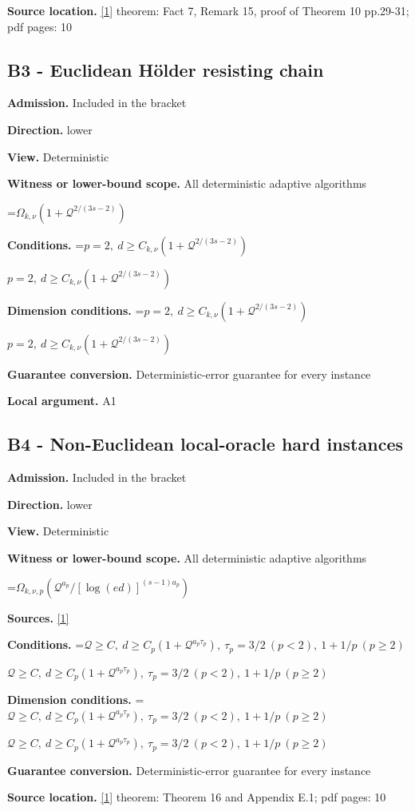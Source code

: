\documentclass[10pt,a4paper]{article}
\newcommand{\AtlasMath}[1]{\par\begingroup\centering\setbox0=\hbox{$\displaystyle #1$}\ifdim\wd0>1.4\linewidth\typeout{ATLAS WIDE FORMULA: \the\wd0}\fi\ifdim\wd0>\linewidth\resizebox{\linewidth}{!}{\box0}\else\box0\fi\par\endgroup}
\newcommand{\AtlasInlineMath}[1]{\begingroup\setbox0=\hbox{$#1$}\ifdim\wd0>.4\linewidth\endgroup\AtlasMath{#1}\else\endgroup$#1$\fi}
\begin{document}
\textbf{Source location.} \href{https://arxiv.org/pdf/2411.08987v2}{[1]} theorem: Fact 7, Remark 15, proof of Theorem 10 pp.29-31; pdf pages: 10

\subsection{B3 - Euclidean Hölder resisting chain}
\textbf{Admission.} Included in the bracket

\textbf{Direction.} lower

\textbf{View.} Deterministic

\textbf{Witness or lower-bound scope.} All deterministic adaptive algorithms

\AtlasMath{\Omega_{k,\nu}(1+\mathcal{Q}^{2/(3s-2)})}
\textbf{Conditions.} \AtlasInlineMath{p=2,\ d\ge C_{k,\nu}(1+\mathcal{Q}^{2/(3s-2)})}

\textbf{Dimension conditions.} \AtlasInlineMath{p=2,\ d\ge C_{k,\nu}(1+\mathcal{Q}^{2/(3s-2)})}

\textbf{Guarantee conversion.} Deterministic-error guarantee for every instance

\textbf{Local argument.} A1

\subsection{B4 - Non-Euclidean local-oracle hard instances}
\textbf{Admission.} Included in the bracket

\textbf{Direction.} lower

\textbf{View.} Deterministic

\textbf{Witness or lower-bound scope.} All deterministic adaptive algorithms

\AtlasMath{\Omega_{k,\nu,p}(\mathcal{Q}^{a_p}/[\log(ed)]^{(s-1)a_p})}
\textbf{Sources.} \href{https://arxiv.org/pdf/2411.08987v2}{[1]}

\textbf{Conditions.} \AtlasInlineMath{\mathcal{Q}\ge C,\ d\ge C_p(1+\mathcal{Q}^{a_p\tau_p}),\ \tau_p=3/2\ (p<2),\ 1+1/p\ (p\ge2)}

\textbf{Dimension conditions.} \AtlasInlineMath{\mathcal{Q}\ge C,\ d\ge C_p(1+\mathcal{Q}^{a_p\tau_p}),\ \tau_p=3/2\ (p<2),\ 1+1/p\ (p\ge2)}

\textbf{Guarantee conversion.} Deterministic-error guarantee for every instance

\textbf{Source location.} \href{https://arxiv.org/pdf/2411.08987v2}{[1]} theorem: Theorem 16 and Appendix E.1; pdf pages: 10
\end{document}
